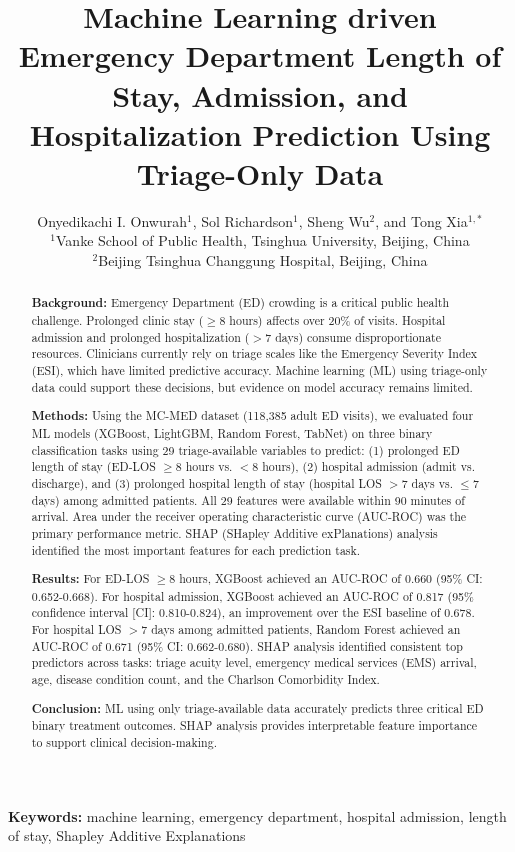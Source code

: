 \documentclass[harvard,article]{frontiersinFPHY_FAMS}
\title{Machine Learning driven Emergency Department Length of Stay, Admission, and Hospitalization Prediction Using Triage-Only Data}
\author{Onyedikachi I. Onwurah$^{1}$, Sol Richardson$^{1}$, Sheng Wu$^{2}$, and  Tong Xia$^{1,*}$ \\
\vspace{0.2cm}
\small{$^{1}$Vanke School of Public Health, Tsinghua University, Beijing, China}\\
\small{$^{2}$Beijing Tsinghua Changgung Hospital, Beijing, China} \\
}
\begin{document}
\maketitle

\begin{abstract}

\noindent\textbf{Background:} Emergency Department (ED) crowding is a critical public health challenge. Prolonged clinic stay ($\geq$8 hours) affects over 20\% of visits. Hospital admission and prolonged hospitalization ($>$7 days) consume disproportionate resources. Clinicians currently rely on triage scales like the Emergency Severity Index (ESI), which have limited predictive accuracy. Machine learning (ML) using triage-only data could support these decisions, but evidence on model accuracy remains limited.

\noindent\textbf{Methods:} Using the MC-MED dataset (118,385 adult ED visits), we evaluated four ML models (XGBoost, LightGBM, Random Forest, TabNet) on three binary classification tasks using 29 triage-available variables to predict: (1) prolonged ED length of stay (ED-LOS $\geq$8 hours vs. $<$8 hours), (2) hospital admission (admit vs. discharge), and (3) prolonged hospital length of stay (hospital LOS $>$7 days vs. $\leq$7 days) among admitted patients. All 29 features were available within 90 minutes of arrival. Area under the receiver operating characteristic curve (AUC-ROC) was the primary performance metric. SHAP (SHapley Additive exPlanations) analysis identified the most important features for each prediction task.

\noindent\textbf{Results:} For ED-LOS $\geq$8 hours, XGBoost achieved an AUC-ROC of 0.660 (95\% CI: 0.652-0.668). For hospital admission, XGBoost achieved an AUC-ROC of 0.817 (95\% confidence interval [CI]: 0.810-0.824), an improvement over the ESI baseline of 0.678. For hospital LOS $>$7 days among admitted patients, Random Forest achieved an AUC-ROC of 0.671 (95\% CI: 0.662-0.680). SHAP analysis identified consistent top predictors across tasks: triage acuity level, emergency medical services (EMS) arrival, age, disease condition count, and the Charlson Comorbidity Index.

\noindent\textbf{Conclusion:} ML using only triage-available data accurately predicts three critical ED binary treatment outcomes. SHAP analysis provides interpretable feature importance to support clinical decision-making.
\end{abstract}
\noindent\textbf{Keywords:} machine learning, emergency department, hospital admission, length of stay, Shapley Additive Explanations
\end{document}
